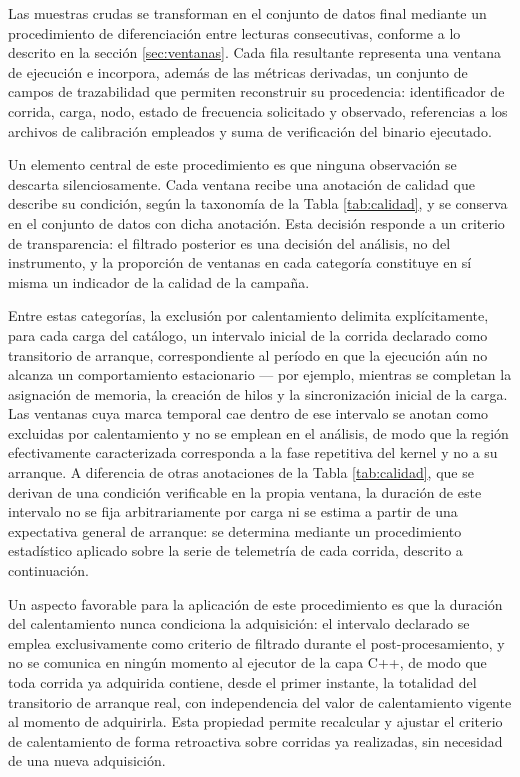 \documentclass[12pt,oneside,spanish]{book}
\begin{document}
Las muestras crudas se transforman en el conjunto de datos final mediante un procedimiento de diferenciación entre lecturas consecutivas, conforme a lo descrito en la sección \ref{sec:ventanas}. Cada fila resultante representa una ventana de ejecución e incorpora, además de las métricas derivadas, un conjunto de campos de trazabilidad que permiten reconstruir su procedencia: identificador de corrida, carga, nodo, estado de frecuencia solicitado y observado, referencias a los archivos de calibración empleados y suma de verificación del binario ejecutado.

Un elemento central de este procedimiento es que ninguna observación se descarta silenciosamente. Cada ventana recibe una anotación de calidad que describe su condición, según la taxonomía de la Tabla \ref{tab:calidad}, y se conserva en el conjunto de datos con dicha anotación. Esta decisión responde a un criterio de transparencia: el filtrado posterior es una decisión del análisis, no del instrumento, y la proporción de ventanas en cada categoría constituye en sí misma un indicador de la calidad de la campaña.

\label{sec:calentamiento}
Entre estas categorías, la exclusión por calentamiento delimita explícitamente, para cada carga del catálogo, un intervalo inicial de la corrida declarado como transitorio de arranque, correspondiente al período en que la ejecución aún no alcanza un comportamiento estacionario --- por ejemplo, mientras se completan la asignación de memoria, la creación de hilos y la sincronización inicial de la carga. Las ventanas cuya marca temporal cae dentro de ese intervalo se anotan como excluidas por calentamiento y no se emplean en el análisis, de modo que la región efectivamente caracterizada corresponda a la fase repetitiva del kernel y no a su arranque. A diferencia de otras anotaciones de la Tabla \ref{tab:calidad}, que se derivan de una condición verificable en la propia ventana, la duración de este intervalo no se fija arbitrariamente por carga ni se estima a partir de una expectativa general de arranque: se determina mediante un procedimiento estadístico aplicado sobre la serie de telemetría de cada corrida, descrito a continuación.

Un aspecto favorable para la aplicación de este procedimiento es que la duración del calentamiento nunca condiciona la adquisición: el intervalo declarado se emplea exclusivamente como criterio de filtrado durante el post-procesamiento, y no se comunica en ningún momento al ejecutor de la capa C++, de modo que toda corrida ya adquirida contiene, desde el primer instante, la totalidad del transitorio de arranque real, con independencia del valor de calentamiento vigente al momento de adquirirla. Esta propiedad permite recalcular y ajustar el criterio de calentamiento de forma retroactiva sobre corridas ya realizadas, sin necesidad de una nueva adquisición.
\end{document}

